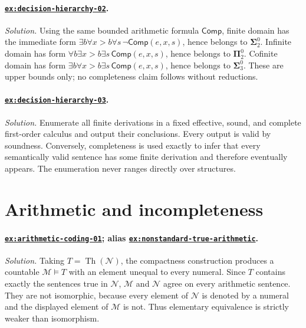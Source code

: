 \documentclass[11pt,oneside,openany]{book}
\theoremstyle{definition}
\theoremstyle{plain}
\theoremstyle{remark}
\newcommand{\Th}{\operatorname{Th}}
\begin{document}
\paragraph{\hyperref[ex:decision-hierarchy-02]{\texttt{ex:decision-hierarchy-02}}.}
\textit{Solution.}  Using the same bounded arithmetic formula
\(\mathsf{Comp}\), finite domain has
the immediate form
\(\exists b\forall x>b\forall s\,\neg\mathsf{Comp}(e,x,s)\), hence belongs to
\(\boldsymbol{\Sigma}^0_2\).  Infinite domain has form
\(\forall b\exists x>b\exists s\,\mathsf{Comp}(e,x,s)\), hence belongs to
\(\boldsymbol{\Pi}^0_2\).
Cofinite domain has form
\(\exists b\forall x>b\exists s\,\mathsf{Comp}(e,x,s)\), hence belongs to
\(\boldsymbol{\Sigma}^0_3\).
These are upper bounds only; no completeness claim follows without reductions.

\paragraph{\hyperref[ex:decision-hierarchy-03]{\texttt{ex:decision-hierarchy-03}}.}
\textit{Solution.}  Enumerate all finite derivations in a fixed effective,
sound, and complete first-order calculus and output their conclusions.  Every
output is valid by soundness.  Conversely, completeness is used exactly to
infer that every semantically valid sentence has some finite derivation and
therefore eventually appears.  The enumeration never ranges directly over
structures.

\section{Arithmetic and incompleteness}

\paragraph{\hyperref[ex:arithmetic-coding-01]{\texttt{ex:arithmetic-coding-01}};
alias \hyperref[ex:nonstandard-true-arithmetic]{\texttt{ex:nonstandard-true-arithmetic}}.}
\textit{Solution.}  Taking \(T=\Th(\mathcal N)\), the compactness construction
produces a countable \(\mathcal M\models T\) with an element unequal to every
numeral.  Since \(T\) contains exactly the sentences true in \(\mathcal N\),
\(\mathcal M\) and \(\mathcal N\) agree on every arithmetic sentence.  They
are not isomorphic, because every element of \(\mathcal N\) is denoted by a
numeral and the displayed element of \(\mathcal M\) is not.  Thus elementary
equivalence is strictly weaker than isomorphism.
\end{document}
